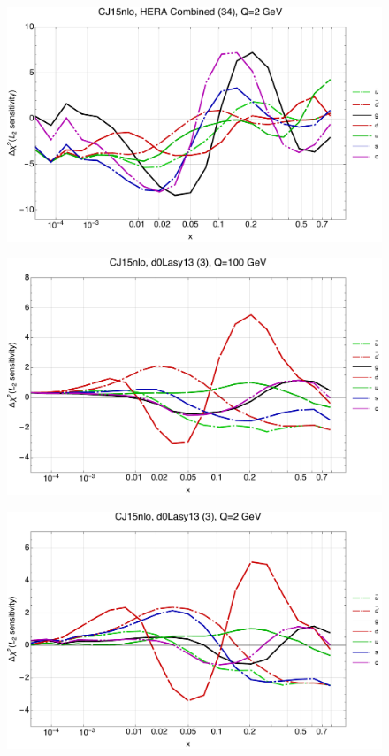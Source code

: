 \documentclass[10pt,aps,prd,floatfix,titlepage]{revtex4}
\begin{document}
\begin{figure}
\includegraphics[width=\textwidth,height=0.44\textheight,keepaspectratio]{1/34_CJ15nlo_L2_q2_Sf_1.pdf}
\caption{}
\end{figure}
\clearpage
\begin{figure}
\includegraphics[width=\textwidth,height=0.44\textheight,keepaspectratio]{1/3_CJ15nlo_L2_q100_Sf_1.pdf}
\caption{}
\end{figure}
\begin{figure}
\includegraphics[width=\textwidth,height=0.44\textheight,keepaspectratio]{1/3_CJ15nlo_L2_q2_Sf_1.pdf}
\caption{}
\end{figure}
\end{document}

